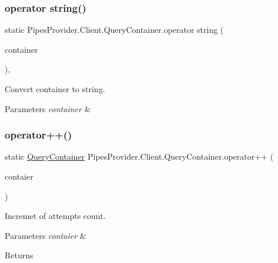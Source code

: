 \subsubsection{\texorpdfstring{operator string()}{operator string()}}
{\footnotesize\ttfamily static Pipes\+Provider.\+Client.\+Query\+Container.\+operator string (\begin{DoxyParamCaption}\item[{\mbox{\hyperlink{struct_pipes_provider_1_1_client_1_1_query_container}{Query\+Container}}}]{container }\end{DoxyParamCaption})\hspace{0.3cm}{\ttfamily [explicit]}, {\ttfamily [static]}}



Convert container to string. 


\begin{DoxyParams}{Parameters}
{\em container} & \\
\hline
\end{DoxyParams}
\mbox{\label{struct_pipes_provider_1_1_client_1_1_query_container_a9a97cf832c6736f14f5ed2661fbb3bce}} 
\subsubsection{\texorpdfstring{operator++()}{operator++()}}
{\footnotesize\ttfamily static \mbox{\hyperlink{struct_pipes_provider_1_1_client_1_1_query_container}{Query\+Container}} Pipes\+Provider.\+Client.\+Query\+Container.\+operator++ (\begin{DoxyParamCaption}\item[{\mbox{\hyperlink{struct_pipes_provider_1_1_client_1_1_query_container}{Query\+Container}}}]{contaier }\end{DoxyParamCaption})\hspace{0.3cm}{\ttfamily [static]}}



Incremet of attempts count. 


\begin{DoxyParams}{Parameters}
{\em contaier} & \\
\hline
\end{DoxyParams}
\begin{DoxyReturn}{Returns}

\end{DoxyReturn}


